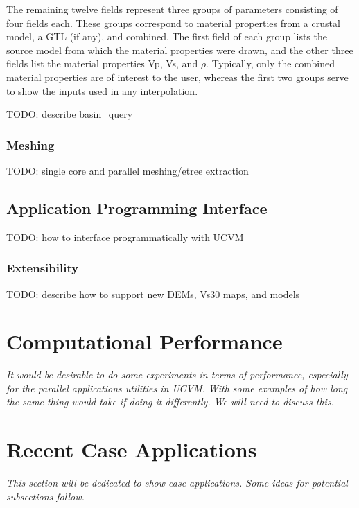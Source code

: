 The remaining twelve fields represent three groups of parameters consisting of four fields each. These groups correspond to material properties from a crustal model, a GTL (if any), and combined. The first field of each group lists the source model from which the material properties were drawn, and the other three fields list the material properties Vp, Vs, and $\rho$. Typically, only the combined material properties are of interest to the user, whereas the first two groups serve to show the inputs used in any interpolation.

TODO: describe basin\_query

\subsubsection{Meshing}

TODO: single core and parallel meshing/etree extraction

\subsection{Application Programming Interface}

TODO: how to interface programmatically with UCVM

\subsubsection{Extensibility}

TODO: describe how to support new DEMs, Vs30 maps, and models

\section{Computational Performance}
\label{sec:conclusions}

\textit{
\color{blue}
It would be desirable to do some experiments in terms of performance, especially for the parallel applications utilities in UCVM. With some examples of how long the same thing would take if doing it differently. We will need to discuss this.
}

\section{Recent Case Applications}
\label{sec:conclusions}

\textit{
\color{blue}
This section will be dedicated to show case applications. Some ideas for potential subsections follow.
}

